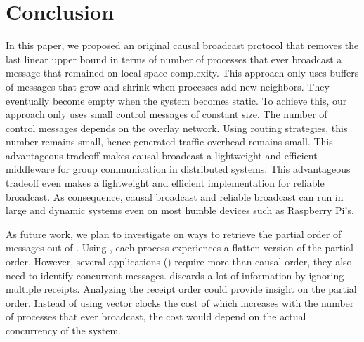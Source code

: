 
\section{Conclusion}
\label{sec:conclusion}


In this paper, we proposed an original causal broadcast protocol that removes
the last linear upper bound in terms of number of processes that ever broadcast
a message that remained on local space complexity. This approach only uses
buffers of messages that grow and shrink when processes add new neighbors. They
eventually become empty when the system becomes static. To achieve this, our
approach only uses small control messages of constant size. The number of
control messages depends on the overlay network. Using routing strategies, this
number remains small, hence generated traffic overhead remains small. This
advantageous tradeoff makes causal broadcast a lightweight and efficient
middleware for group communication in distributed systems. This advantageous
tradeoff even makes \RPCBROADCAST a lightweight and efficient implementation
for reliable broadcast. As consequence, causal broadcast and reliable broadcast
can run in large and dynamic systems even on most humble devices such as
Raspberry Pi’s.

As future work, we plan to investigate on ways to retrieve the partial order of
messages out of \RPCBROADCAST. Using \RPCBROADCAST, each process experiences a
flatten version of the partial order. However, several applications (\REF)
require more than causal order, they also need to identify concurrent
messages. \RPCBROADCAST discards a lot of information by ignoring multiple
receipts. Analyzing the receipt order could provide insight on the partial
order. Instead of using vector clocks the cost of which increases with the
number of processes that ever broadcast, the cost would depend on the actual
concurrency of the system.







